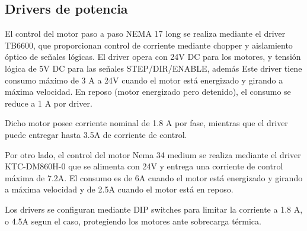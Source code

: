 \subsection{Drivers de potencia}
El control del motor paso a paso NEMA 17 long se realiza mediante el driver TB6600, que proporcionan control de corriente mediante chopper y aislamiento óptico de señales lógicas. El driver opera con 24V DC para los motores, y tensión lógica de 5V DC para las señales STEP/DIR/ENABLE, además Este driver tiene consumo máximo de 3 A a 24V cuando el motor está energizado y girando a máxima velocidad. En reposo (motor energizado pero detenido), el consumo se reduce a 1 A por driver. 

Dicho motor posee corriente nominal de 1.8 A por fase, mientras que el driver puede entregar hasta 3.5A de corriente de control.

Por otro lado, el control del motor Nema 34 medium se realiza mediante el driver KTC-DM860H-0 que se alimenta con 24V y entrega una corriente de control máxima de 7.2A. El consumo es de 6A cuando el motor está energizado y girando a máxima velocidad y de 2.5A cuando el motor está en reposo.

Los drivers se configuran mediante DIP switches para limitar la corriente a 1.8 A, o 4.5A segun el caso, protegiendo los motores ante sobrecarga térmica.
